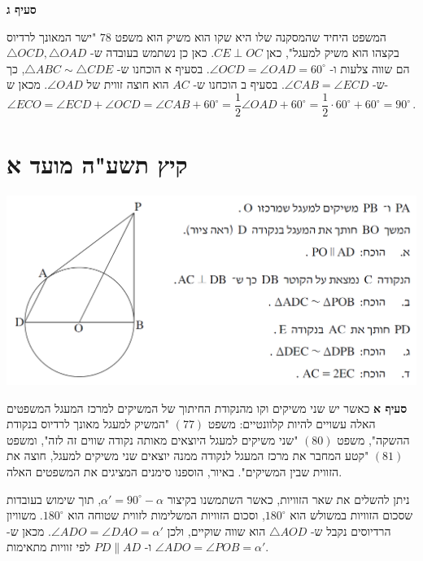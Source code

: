 \documentclass[12pt,a4paper]{article}
\begin{document}
\textbf{סעיף ג}

המשפט היחיד שהמסקנה שלו היא שקו הוא משיק הוא משפט
$78$
"ישר המאונך לרדיוס בקצהו הוא משיק למעגל", כאן
$CE\perp OC$.
כאן כן נשתמש בעובדה ש-%
$\triangle OCD,\triangle OAD$
הם שווה צלעות ו-%
$\angle OCD=\angle OAD=60^\circ$.
בסעיף א הוכחנו ש-%
$\triangle ABC\sim \triangle CDE$,
כך ש-%
$\angle CAB = \angle ECD$.
בסעיף ב הוכחנו ש-%
$AC$
הוא חוצה זווית של
$\angle OAD$.
מכאן ש-%
\[
\angle ECO = \angle ECD + \angle OCD = \angle CAB + 60^\circ = \frac{1}{2}\angle OAD + 60^\circ=\frac{1}{2}\cdot 60^\circ + 60^\circ = 90^\circ\,.
\]


\newpage


\section{קיץ תשע"ה מועד א}

\begin{center}
\includegraphics[width=\textwidth]{summer-2015a-4}
\end{center}

\textbf{סעיף א}
כאשר יש שני משיקים וקו מהנקודת החיתוך של המשיקים למרכז המעגל המשפטים האלה עשויים להיות קלוונטיים: משפט
$(77)$
"המשיק למעגל מאונך לרדיוס בנקודת ההשקה", משפט
$(80)$
"שני משיקים למעגל היוצאים מאותה נקודה שווים זה לזה", ומשפט
$(81)$
"קטע המחבר את מרכז המעגל לנקודה ממנה יוצאים שני משיקים למעגל, חוצה את הזווית שבין המשיקים". באיור, הוספנו סימנים המציגים את המשפטים האלה. 

ניתן להשלים את שאר הזוויות, כאשר השתמשנו בקיצור
$\alpha' = 90^\circ-\alpha$,
תוך שימוש בעובדות שסכום הזוויות במשולש הוא
$180^\circ$,
וסכום הזוויות המשלימות לזווית שטוחה הוא
$180^\circ$.
משוויון הרדיוסים נקבל ש-%
$\triangle AOD$
הוא שווה שוקיים, ולכן
$\angle ADO=\angle DAO=\alpha'$.
מכאן ש-%
$\angle ADO=\angle POB=\alpha'$
ו-%
$PD\|AD$
לפי זוויות מתאימות.
\end{document}

